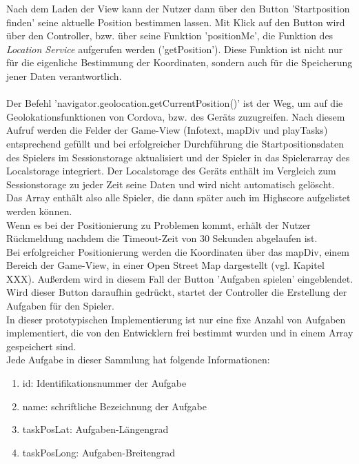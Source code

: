 Nach dem Laden der View kann der Nutzer dann über den Button 'Startposition finden' seine aktuelle Position bestimmen lassen. Mit Klick auf den Button wird über den Controller, bzw. über seine Funktion 'positionMe', die Funktion des \emph{Location Service} aufgerufen werden ('getPosition'). Diese Funktion ist nicht nur für die eigenliche Bestimmung der Koordinaten, sondern auch für die Speicherung jener Daten verantwortlich.
\\
\\
Der Befehl 'navigator.geolocation.getCurrentPosition()' ist der Weg, um auf die Geolokationsfunktionen von Cordova, bzw. des Geräts zuzugreifen. Nach diesem Aufruf werden die Felder der Game-View (Infotext, mapDiv und playTasks) entsprechend gefüllt und bei erfolgreicher Durchführung die Startpositionsdaten des Spielers %
im Sessionstorage aktualisiert und der Spieler in das Spielerarray des Localstorage integriert. Der Localstorage des Geräts enthält im Vergleich zum Sessionstorage zu jeder Zeit seine Daten und wird nicht automatisch gelöscht. Das Array enthält also alle Spieler, die dann später auch im Highscore aufgelistet werden können.
\\
Wenn es bei der Positionierung zu Problemen kommt, erhält der Nutzer Rückmeldung nachdem die Timeout-Zeit von 30 Sekunden abgelaufen ist.
\\
Bei erfolgreicher Positionierung werden die Koordinaten über das mapDiv, einem Bereich der Game-View, in einer Open Street Map dargestellt (vgl. Kapitel XXX). Außerdem wird in diesem Fall der Button 'Aufgaben spielen' eingeblendet.
\\
Wird dieser Button daraufhin gedrückt, startet der Controller die Erstellung der Aufgaben für den Spieler.
\\
In dieser prototypischen Implementierung ist nur eine fixe Anzahl von Aufgaben implementiert, die von den Entwicklern frei bestimmt wurden und in einem Array gespeichert sind.
\\
Jede Aufgabe in dieser Sammlung hat folgende Informationen:
\begin{enumerate}
\item id: Identifikationsnummer der Aufgabe
\item name: schriftliche Bezeichnung der Aufgabe
\item taskPosLat: Aufgaben-Längengrad
\item taskPosLong: Aufgaben-Breitengrad
\end{enumerate}

